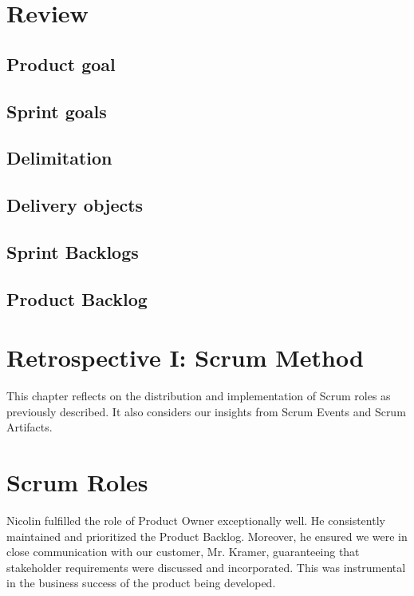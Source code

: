 \section{Review}

\subsection{Product goal}


\subsection{Sprint goals}

\subsection{Delimitation}


\subsection{Delivery objects}


\subsection{Sprint Backlogs}


\subsection{Product Backlog}


\section{Retrospective I: Scrum Method}

This chapter reflects on the distribution and implementation of Scrum roles as previously described.
It also considers our insights from Scrum Events and Scrum Artifacts.

\section{Scrum Roles}

Nicolin fulfilled the role of Product Owner exceptionally well.
He consistently maintained and prioritized the Product Backlog.
Moreover, he ensured we were in close communication with our customer, Mr. Kramer, guaranteeing that stakeholder requirements were discussed and incorporated.
This was instrumental in the business success of the product being developed.

